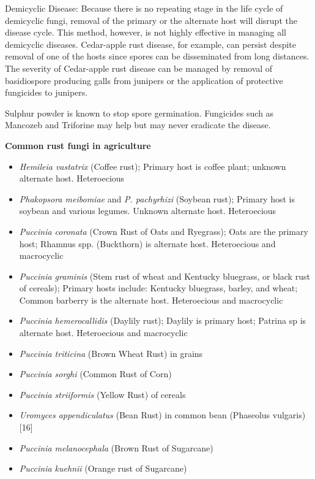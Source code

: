 \documentclass[
  openany]{book}
\providecommand{\tightlist}{%
  \setlength{\itemsep}{0pt}\setlength{\parskip}{0pt}}
\begin{document}
Demicyclic Disease: Because there is no repeating stage in the life cycle of demicyclic fungi, removal of the primary or the alternate host will disrupt the disease cycle. This method, however, is not highly effective in managing all demicyclic diseases. Cedar-apple rust disease, for example, can persist despite removal of one of the hosts since spores can be disseminated from long distances. The severity of Cedar-apple rust disease can be managed by removal of basidiospore producing galls from junipers or the application of protective fungicides to junipers.

Sulphur powder is known to stop spore germination. Fungicides such as Mancozeb and Triforine may help but may never eradicate the disease.

\textbf{Common rust fungi in agriculture}

\begin{itemize}
\tightlist
\item
  \emph{Hemileia vastatrix} (Coffee rust); Primary host is coffee plant; unknown alternate host. Heteroecious
\item
  \emph{Phakopsora meibomiae} and \emph{P. pachyrhizi} (Soybean rust); Primary host is soybean and various legumes. Unknown alternate host. Heteroecious
\item
  \emph{Puccinia coronata} (Crown Rust of Oats and Ryegrass); Oats are the primary host; Rhamnus spp. (Buckthorn) is alternate host. Heteroecious and macrocyclic
\item
  \emph{Puccinia graminis} (Stem rust of wheat and Kentucky bluegrass, or black rust of cereals); Primary hosts include: Kentucky bluegrass, barley, and wheat; Common barberry is the alternate host. Heteroecious and macrocyclic
\item
  \emph{Puccinia hemerocallidis} (Daylily rust); Daylily is primary host; Patrina sp is alternate host. Heteroecious and macrocyclic
\item
  \emph{Puccinia triticina} (Brown Wheat Rust) in grains
\item
  \emph{Puccinia sorghi} (Common Rust of Corn)
\item
  \emph{Puccinia striiformis} (Yellow Rust) of cereals
\item
  \emph{Uromyces appendiculatus} (Bean Rust) in common bean (Phaseolus vulgaris){[}16{]}
\item
  \emph{Puccinia melanocephala} (Brown Rust of Sugarcane)
\item
  \emph{Puccinia kuehnii} (Orange rust of Sugarcane)
\end{itemize}
\end{document}
